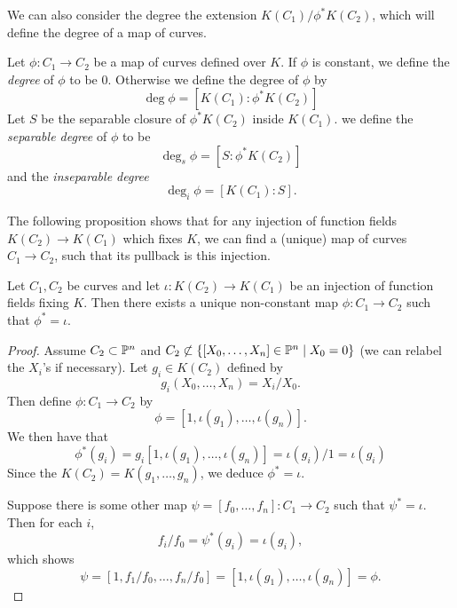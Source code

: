 We can also consider the degree the extension $K(C_1)/\phi^*K(C_2)$,
which will define the degree of a map of curves.

\begin{definition}
	Let $\phi: C_1 \to C_2$ be a map of curves defined over $K$.
	If $\phi$ is constant, we define the \emph{degree} of $\phi$ to be $0$.
	Otherwise we define the degree of $\phi$ by
	\begin{equation*}
		\deg\phi = [K(C_1): \phi^*K(C_2)]
	\end{equation*}
	Let $S$ be the separable closure of $\phi^*K(C_2)$ inside $K(C_1)$.
	we define the \emph{separable degree} of $\phi$ to be
	\begin{equation*}
		\deg_s\phi = [S: \phi^*K(C_2)]
	\end{equation*}
	and the \emph{inseparable degree}
	\begin{equation*}
		\deg_i\phi = [K(C_1): S].
	\end{equation*}
\end{definition}

The following proposition
shows that for any injection of function fields $K(C_2) \to K(C_1)$
which fixes $K$, we
can find a (unique)
map of curves $C_1 \to C_2$, such that its pullback is this
injection. 

\begin{proposition}
	\label{prop:existence-inclusion}
	Let $C_1, C_2$ be curves and
	let $\iota: K(C_2) \to K(C_1)$ be an injection of function fields
	fixing $K$. Then there exists a unique non-constant map $\phi: C_1 \to C_2$
	such that $\phi^* = \iota$.
\end{proposition}

\begin{proof}
	Assume $C_2 \subset \mathbb{P}^n$ and $C_2 \not\subset \{[X_0, \dots, X_n] \in
	\mathbb{P}^n \mid X_0 = 0\}$ (we can relabel the $X_i$'s if necessary).
	Let $g_i \in K(C_2)$ defined by 
	\begin{equation*}
		g_i(X_0, \dots, X_n) = X_i/X_0.
	\end{equation*}
	Then define $\phi: C_1 \to C_2$ by
	\begin{equation*}
		\phi = [1, \iota(g_1), \dots, \iota(g_n)].
	\end{equation*}
	We then have that
	\begin{equation*}
		\phi^*(g_i) = g_i[1, \iota(g_1), \dots, \iota(g_n)]	
		= \iota(g_i)/1 = \iota(g_i)
	\end{equation*}
	Since the $K(C_2) = K(g_1, \dots, g_n)$, we deduce
	$\phi^* = \iota$.

	Suppose there is some other map $\psi = [f_0, \dots, f_n]: C_1 \to C_2$
	such that $\psi^* = \iota$. Then for each $i$,
	\begin{equation*}
		f_i/f_0 = \psi^*(g_i) = \iota(g_i),
	\end{equation*}
	which shows
	\begin{equation*}
		\psi = [1, f_1/f_0, \dots, f_n/f_0] = [1, \iota(g_1), \dots, \iota(g_n)]
		= \phi.
	\end{equation*}
\end{proof}


